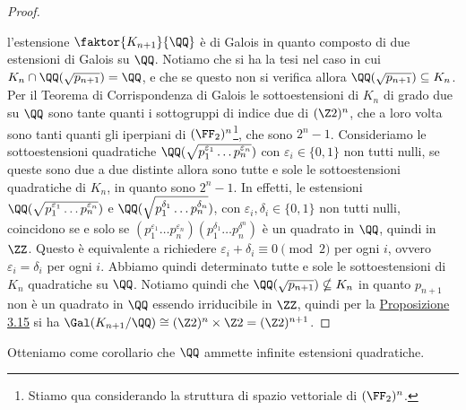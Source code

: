 \documentclass[11pt]{scrartcl}
\begin{document}
\begin{proof}
\begin{center}
    \end{center}
    l'estensione $\faktor{K_{n + 1}}{\QQ}$ è di Galois in quanto composto
    di due estensioni di Galois su $\QQ$. Notiamo che si ha la tesi nel caso 
    in cui $K_n \cap \QQ(\sqrt{p_{n + 1}}) = \QQ$, e che se questo non si 
    verifica allora $\QQ(\sqrt{p_{n + 1}}) \subseteq K_n$. Per il Teorema di 
    Corrispondenza di Galois le sottoestensioni di $K_n$ di grado due su 
    $\QQ$ sono tante quanti i sottogruppi di indice due di $(\Z2)^n$, che a 
    loro volta sono tanti quanti gli iperpiani di $(\FF_2)^n$\footnote{
        Stiamo qua considerando la struttura di spazio vettoriale di $(\FF_2)^n$.
    }, che sono $2^n - 1$.
    Consideriamo le sottoestensioni quadratiche 
    $\QQ(\sqrt{p_1^{\varepsilon_1}\ldots p_n^{\varepsilon_n}})$ con $\varepsilon_i \in \{0, 1\}$
    non tutti nulli, se queste sono due a due distinte allora sono tutte e sole
    le sottoestensioni quadratiche di $K_n$, in quanto sono $2^n - 1$. In effetti,
    le estensioni $\QQ(\sqrt{p_1^{\varepsilon_1}\ldots p_n^{\varepsilon_n}})$ e
    $\QQ(\sqrt{p_1^{\delta_1}\ldots p_n^{\delta_n}})$, con 
    $\varepsilon_i, \delta_i \in \{0, 1\}$ non tutti nulli, coincidono se e solo se 
    $(p_1^{\varepsilon_1}\ldots p_n^{\varepsilon_n})(p_1^{\delta_1}\ldots p_n^{\delta^n})$
    è un quadrato in $\QQ$, quindi in $\ZZ$. Questo è equivalente a richiedere
    $\varepsilon_i + \delta_i \equiv 0 \pmod 2$ per ogni $i$, ovvero 
    $\varepsilon_i = \delta_i$ per ogni $i$. Abbiamo quindi determinato tutte 
    e sole le sottoestensioni di $K_n$ quadratiche su $\QQ$. Notiamo quindi 
    che $\QQ(\sqrt{p_{n + 1}}) \nsubseteq K_n$ in quanto $p_{n + 1}$ non è 
    un quadrato in $\QQ$ essendo irriducibile in $\ZZ$, quindi per la 
    \hyperref[prop3.15]{Proposizione 3.15} si ha $\Gal(K_{n + 1}/\QQ) \cong
    (\Z2)^n\times \Z2 = (\Z2)^{n + 1}$.
\end{proof}

\begin{remark}
    Otteniamo come corollario che $\QQ$ ammette infinite estensioni quadratiche.
\end{remark}
\end{document}
